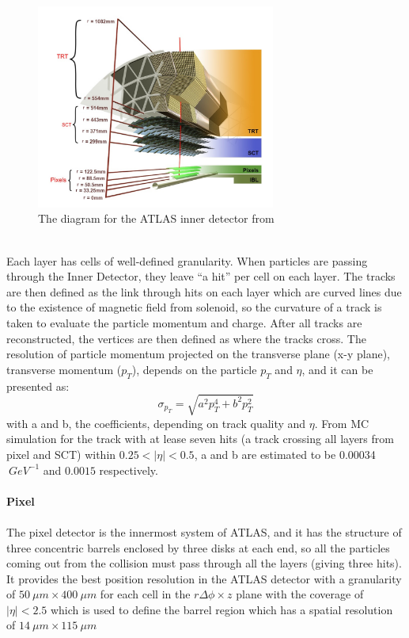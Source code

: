 \begin{figure}[!h]                
	\includegraphics[width=0.7\textwidth]{Chapter2/ID.png}
	\centering
	\begin{center}
		\caption{The diagram for the ATLAS inner detector from \cite{PERF-2015-08}}
		\label{Fig:ID}            
	\end{center}
\end{figure}
\noindent
\\Each layer has cells of well-defined granularity. When particles are passing through the Inner Detector, they leave ``a hit'' per cell on each layer. The tracks are then defined as the link through hits on each layer which are curved lines due to the existence of magnetic field from solenoid, so the curvature of a track is taken to evaluate the particle momentum and charge. After all tracks are reconstructed, the vertices are then defined as where the tracks cross. The resolution of particle momentum projected on the transverse plane (x-y plane), transverse momentum ($p_{T}$), depends on the particle $p_{T}$ and $\eta$, and it can be presented as:
\begin{equation}
\sigma_{p_{T}} = \sqrt{a^{2}p_{T}^{4}+b^{2}p_{T}^{2}}
\end{equation}
with a and b, the coefficients, depending on track quality and $\eta$. From MC simulation for the track with at lease seven hits (a track crossing all layers from pixel and SCT) within $0.25<|\eta|<0.5$, a and b are estimated to be 0.00034 $~GeV^{-1}$ and $0.0015$ respectively.
\\
\\{\bf Pixel\cite{Collaboration:2285585}}
\\
\\The pixel detector is the innermost system of ATLAS, and it has the structure of three concentric barrels enclosed by three disks at each end, so all the particles coming out from the collision must pass through all the layers (giving three hits). It provides the best position resolution in the ATLAS detector with a granularity of $50~\mu m\times 400~\mu m$  for each cell in the $r\Delta \phi \times z$ plane with the coverage of $|\eta|<2.5$ which is used to define the barrel region which has a spatial resolution of $14~\mu m\times 115~\mu m$
